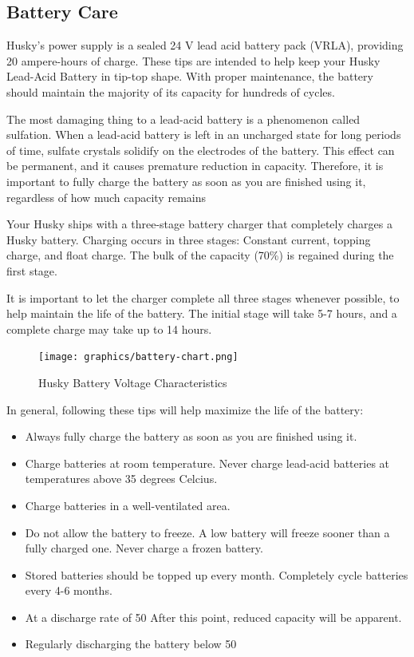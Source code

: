 \documentclass[]{clearpath-latex/clearpath-manual}
\begin{document}
\subsection{Battery Care}
Husky’s power supply is a sealed 24 V lead acid battery pack (VRLA), providing 20 ampere-hours of charge. These tips are
intended to help keep your Husky Lead-Acid Battery in tip-top shape.  With proper maintenance, the battery should
maintain the majority of its capacity for hundreds of cycles.

The most damaging thing to a lead-acid battery is a phenomenon called sulfation.
When a lead-acid battery is left in an uncharged state for long periods of time,
sulfate crystals solidify on the electrodes of the battery.  This effect can be permanent,
and it causes premature reduction in capacity.  Therefore, it is important to fully charge
the battery as soon as you are finished using it, regardless of how much capacity remains

Your Husky ships with a three-stage battery charger that completely charges a Husky battery.
Charging occurs in three stages: Constant current, topping charge, and float charge.
The bulk of the capacity (70\%) is regained during the first stage.

It is important to let the charger complete all three stages whenever possible,
to help maintain the life of the battery.  The initial stage will take 5-7 hours,
and a complete charge may take up to 14 hours.

\begin{figure}[h]
	\centering
	\texttt{[image: graphics/battery-chart.png]}
	\caption{Husky Battery Voltage Characteristics}
	\label{battery-chart}
\end{figure}

In general, following these tips will help maximize the life of the battery:

\begin{itemize}
	\item Always fully charge the battery as soon as you are finished using it.
	\item Charge batteries at room temperature.  Never charge lead-acid batteries at temperatures above 35 degrees Celcius.
	\item Charge batteries in a well-ventilated area.
	\item Do not allow the battery to freeze.  A low battery will freeze sooner than a fully charged one.  Never charge a frozen battery.
	\item Stored batteries should be topped up every month.  Completely cycle batteries every 4-6 months.
	\item At a discharge rate of 50%
	After this point, reduced capacity will be apparent.
	\item Regularly discharging the battery below 50%
\end{itemize}
\end{document}
